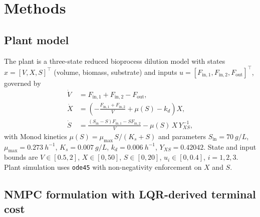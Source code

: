 \documentclass[11pt,a4paper]{article}
\begin{document}
\section{Methods}
\label{sec:methods}

\subsection{Plant model}

The plant is a three-state reduced bioprocess dilution model with states $x = [V, X, S]^\top$ (volume, biomass, substrate) and inputs $u = [F_{\mathrm{in},1}, F_{\mathrm{in},2}, F_{\mathrm{out}}]^\top$, governed by
\begin{align}
\dot V &= F_{\mathrm{in},1} + F_{\mathrm{in},2} - F_{\mathrm{out}}, \\
\dot X &= \left(-\frac{F_{\mathrm{in},1}+F_{\mathrm{in},2}}{V} + \mu(S) - k_d\right) X, \\
\dot S &= \frac{(S_{\mathrm{in}}-S)F_{\mathrm{in},1} - S F_{\mathrm{in},2}}{V} - \mu(S)\, X\, Y_{XS}^{-1},
\end{align}
with Monod kinetics $\mu(S) = \mu_{\max}\, S / (K_s + S)$ and parameters $S_{\mathrm{in}} = \SI{70}{g\per L}$, $\mu_{\max} = \SI{0.273}{h^{-1}}$, $K_s = \SI{0.007}{g\per L}$, $k_d = \SI{0.006}{h^{-1}}$, $Y_{XS} = 0.42042$. State and input bounds are $V \in [0.5, 2]$, $X \in [0, 50]$, $S \in [0, 20]$, $u_i \in [0, 0.4]$, $i = 1,2,3$. Plant simulation uses \texttt{ode45} with non-negativity enforcement on $X$ and $S$.

\subsection{NMPC formulation with LQR-derived terminal cost}
\end{document}
